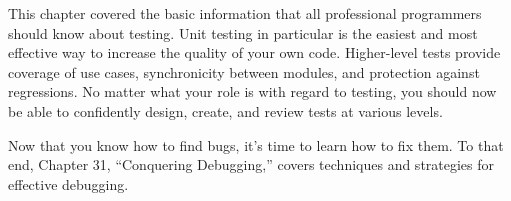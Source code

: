 This chapter covered the basic information that all professional programmers should know about testing. Unit testing in particular is the easiest and most effective way to increase the quality of your own code. Higher-level tests provide coverage of use cases, synchronicity between modules, and protection against regressions. No matter what your role is with regard to testing, you should now be able to confidently design, create, and review tests at various levels.

Now that you know how to find bugs, it’s time to learn how to fix them. To that end, Chapter 31, “Conquering Debugging,” covers techniques and strategies for effective debugging.